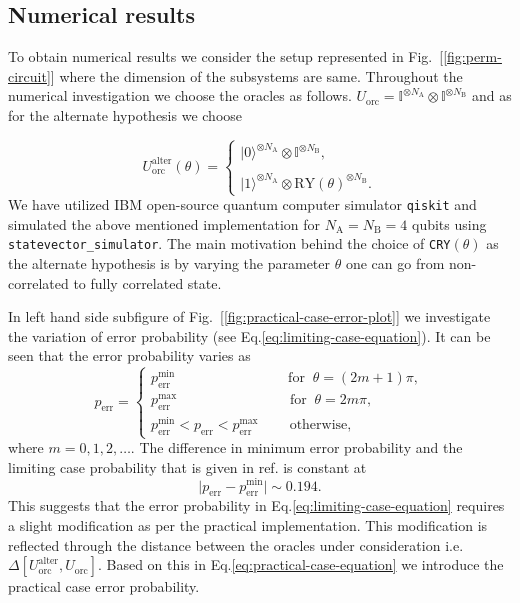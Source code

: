\documentclass[
 aps,
 jmp,
 amsmath,amssymb,
 reprint,
]{revtex4-2}
\begin{document}
\subsection{Numerical results}
To obtain numerical results we consider the setup represented in Fig.~[\ref{fig:perm-circuit}] where the dimension of the subsystems are same. Throughout the numerical investigation we choose the oracles as follows. $U_\textrm{orc} = \mathbb{I}^{\otimes N_\textrm{A}}\otimes \mathbb{I}^{\otimes N_\textrm{B}}$ and as for the alternate hypothesis we choose

\begin{equation}
U_\textrm{orc}^\textrm{alter}(\theta)= 
\begin{cases}
\lvert0\rangle^{\otimes N_\textrm{A}} \otimes \mathbb{I}^{\otimes N_\textrm{B}}, \\\\
\lvert1\rangle^{\otimes N_\textrm{A}} \otimes \textrm{RY}(\theta)^{\otimes N_\textrm{B}}.
\end{cases}
\label{eq:alternate-hypothesis}
\end{equation}
We have utilized IBM open-source quantum computer simulator \texttt{qiskit} and simulated the above mentioned implementation for $N_\textrm{A}=N_\textrm{B}=4$ qubits using \texttt{statevector\_simulator}. The main motivation behind the choice of \texttt{CRY$(\theta)$} as the alternate hypothesis is by varying the parameter $\theta$ one can go from non-correlated to fully correlated state.

In left hand side subfigure of Fig.~[\ref{fig:practical-case-error-plot}] we investigate the variation of error probability (see Eq.\eqref{eq:limiting-case-equation}). It can be seen that the error probability varies as
\[
p_\textrm{err} = 
\begin{cases}
p_\textrm{err}^\textrm{min}\;\;\;\;\;\;\;\;\;\;\;\;\;\;\;\;\;\;\;\;\;\;\;\;\;\;\;\;\; \textrm{for}\;\; \theta = (2m+1)\pi,\\

p_\textrm{err}^\textrm{max} \;\;\;\;\;\;\;\;\;\;\;\;\;\;\;\;\;\;\;\;\;\;\;\;\;\;\;\;\; \textrm{for}\;\; \theta = 2m\pi,\\

p_\textrm{err}^\textrm{min}<p_\textrm{err} <p_\textrm{err}^\textrm{max}\;\;\;\;\;\;\;\; \textrm{otherwise},
\end{cases}
\]
where $m=0,1,2,\ldots$. The difference in minimum error probability and the limiting case probability that is given in ref.\cite{chiribella2019quantum} is constant at
\begin{equation}
\lvert p_\textrm{err}-p_\textrm{err}^\textrm{min}\rvert\sim 0.194. 
\end{equation}
This suggests that the error probability in Eq.\eqref{eq:limiting-case-equation} requires a slight modification as per the practical implementation. This modification is reflected through the distance between the oracles under consideration i.e. $\Delta\left[U_\textrm{orc}^\textrm{alter},U_\textrm{orc}\right]$. Based on this in Eq.\eqref{eq:practical-case-equation} we introduce the practical case error probability.
\end{document}
